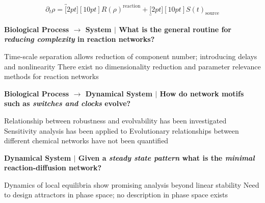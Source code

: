 \documentclass[a0,portrait]{a0poster}
\begin{document}
\begin{align*}
	\partial_t\rho =
	\overbracket[2pt][10pt]{R(\rho)}^{\text{reaction}}+
	\underbracket[2pt][10pt]{S(t)}_{\text{source}}
\end{align*}

\begin{tcolorbox}[boxrule=2pt,arc=3.4pt,boxsep=2mm]
	\begin{center}
		\textbf{\color{Grey}Biological Process $\rightarrow$ System \color{Black}$|$
		What is the general routine for \textit{reducing complexity} in reaction networks?}
	\end{center}
\end{tcolorbox}

\begin{itemize}[leftmargin=5cm]
	\up Time-scale separation allows reduction of component number; introducing delays and nonlinearity
	\down There exist no dimensionality reduction and parameter relevance methods for reaction networks
\end{itemize}

\begin{tcolorbox}[boxrule=2pt,arc=3.4pt,boxsep=2mm]
	\begin{center}
		\textbf{\color{Grey}Biological Process $\rightarrow$ Dynamical System \color{Black}$|$
		How do network motifs such as \textit{switches and clocks} evolve?}
	\end{center}
\end{tcolorbox}

\begin{itemize}[leftmargin=5cm]
	\up Relationship between robustness and evolvability has been investigated \cite{Daniels2008SloppinessBiology}
	\up Sensitivity analysis has been applied to 
	\down Evolutionary relationships between different chemical networks have not been quantified
\end{itemize}

\begin{tcolorbox}[boxrule=2pt,arc=3.4pt,boxsep=2mm]
	\begin{center}
		\textbf{\color{Grey}Dynamical System \color{Black}$|$
		Given a \textit{steady state pattern} what is the \textit{minimal} reaction-diffusion network?}
	\end{center}
\end{tcolorbox}

\begin{itemize}[leftmargin=5cm]
	\up Dynamics of local equilibria show promising analysis beyond linear stability \cite{Halatek2018}
	\down Need to design attractors in phase space; no description in phase space exists
\end{itemize}
\end{document}
